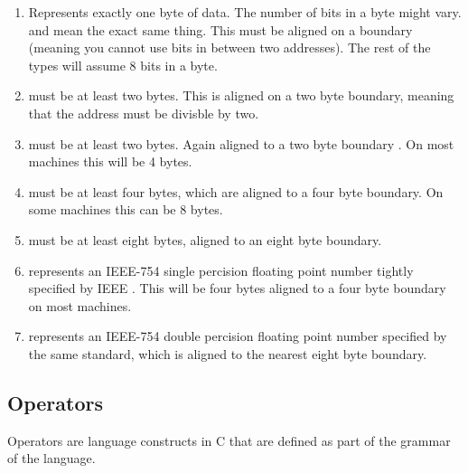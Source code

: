 \begin{enumerate}
\item {} Represents exactly one byte of data. The number of bits in a byte might vary.  and  mean the exact same thing. This must be aligned on a boundary (meaning you cannot use bits in between two addresses). The rest of the types will assume 8 bits in a byte.
\item {} must be at least two bytes. This is aligned on a two byte boundary, meaning that the address must be divisble by two.
\item {} must be at least two bytes. Again aligned to a two byte boundary \cite[P. 34]{ISON1124}. On most machines this will be 4 bytes.
\item {} must be at least four bytes, which are aligned to a four byte boundary. On some machines this can be 8 bytes.
\item {} must be at least eight bytes, aligned to an eight byte boundary.
\item {} represents an IEEE-754 single percision floating point number tightly specified by IEEE \cite{4610935}. This will be four bytes aligned to a four byte boundary on most machines.
\item {} represents an IEEE-754 double percision floating point number specified by the same standard, which is aligned to the nearest eight byte boundary.
\end{enumerate}

\subsection{Operators}

Operators are language constructs in C that are defined as part of the grammar of the language. 

